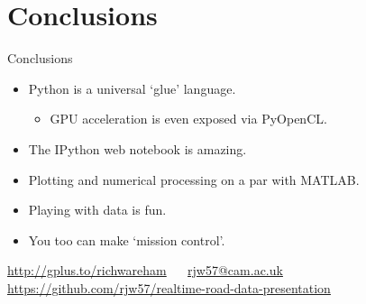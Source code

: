 \documentclass[aspectratio=169]{beamer}
\begin{document}
\section{Conclusions}

\begin{frame}{Conclusions}
  \begin{itemize}
    \item Python is a universal `glue' language.
    \begin{itemize}
      \item GPU acceleration is even exposed via PyOpenCL.
    \end{itemize}
    \item The IPython web notebook is amazing.
    \item Plotting and numerical processing on a par with MATLAB.
    \item Playing with data is fun.
    \item You too can make `mission control'.
  \end{itemize}
  \vspace{2\baselineskip}
  \begin{centering}
    \url{http://gplus.to/richwareham} $\quad$ \url{rjw57@cam.ac.uk}\\
    \vspace{\baselineskip}
    \url{https://github.com/rjw57/realtime-road-data-presentation}\\
  \end{centering}
\end{frame}
\end{document}
